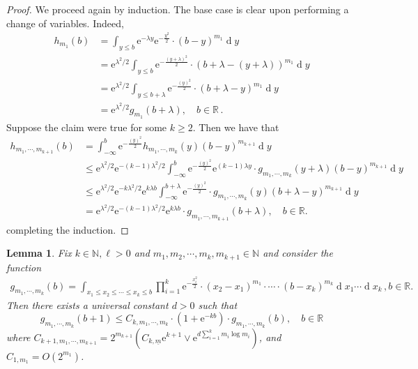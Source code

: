 \documentclass[11pt, reqno]{amsart}
\numberwithin{equation}{section}
\newcounter{dummy} \numberwithin{dummy}{section}
\newtheorem{lemma}[dummy]{Lemma}
\newcommand{\N}{\ensuremath{\mathbb{N}}}
\newcommand{\R}{\ensuremath{\mathbb{R}}}
\newcommand{\diff}{\ensuremath{\operatorname{d}\!}}
\begin{document}
\begin{proof}
    We proceed again by induction. The base case is clear upon performing a change of variables. Indeed, 
    \begin{align*}
            h_{m_1}(b) &= \displaystyle\int_{y\le b}\mathrm{e}^{-\lambda y}\mathrm{e}^{-\frac{y^2}{2}}\cdot(b-y)^{m_1}\diff y\\
            &= \mathrm{e}^{\lambda^2/2} \displaystyle\int_{y\le b}\mathrm{e}^{-\frac{(y+\lambda)^2}{2}}\cdot(b+\lambda-(y+\lambda))^{m_1}\diff y\\
            &= \mathrm{e}^{\lambda^2/2} \displaystyle\int_{y\le b+\lambda}\mathrm{e}^{-\frac{(y)^2}{2}}\cdot(b+\lambda-y)^{m_1}\diff y\\
            & = \mathrm{e}^{\lambda^2/2}g_{m_1}(b+\lambda),\quad b\in \R\,.
    \end{align*}
    Suppose the claim were true for some $k\ge 2$. Then we have that
    \begin{align*}
         h_{m_1, \cdots, m_{k+1}}(b) &= \displaystyle\int^b_{-\infty}\mathrm{e}^{-\frac{(y)^2}{2}} h_{m_1, \cdots, m_{k}}(y)(b-y)^{m_{k+1}}\diff y\\
         & \le \mathrm{e}^{\lambda^2/2}\mathrm{e}^{-(k-1)\lambda^2/2}\displaystyle\int^b_{-\infty}\mathrm{e}^{-\frac{(y)^2}{2}}  \mathrm{e}^{(k-1)\lambda y}\cdot g_{m_1, \cdots, m_k}(y+\lambda)(b-y)^{m_{k+1}}\diff y\\
         & \le  \mathrm{e}^{\lambda^2/2}\mathrm{e}^{-k\lambda^2/2}\mathrm{e}^{k\lambda b}\displaystyle\int^{b+\lambda}_{-\infty} \mathrm{e}^{-\frac{(y)^2}{2}}\cdot g_{m_1, \cdots, m_k}(y)(b+\lambda-y)^{m_{k+1}}\diff y\\
         &=  \mathrm{e}^{\lambda^2/2}\mathrm{e}^{-(k-1)\lambda^2/2}\mathrm{e}^{k\lambda b}\cdot g_{m_1, \cdots, m_{k+1}}(b+\lambda),\quad b\in \R.
    \end{align*}
    completing the induction.
\end{proof}

\begin{lemma}\label{lemma: difference bound} Fix $k\in \N, \ell> 0$ and $m_1, m_2, \cdots, m_k, m_{k+1} \in \N$ and consider the function
\begin{align*}
g_{m_1, \cdots, m_k}(b) = \displaystyle\int_{x_1\le x_2\le \cdots\le x_k\le b}\prod_{i=1}^{k}\mathrm{e}^{-\frac{x_i^2}{2}}\cdot(x_2-x_1)^{m_1}\cdot \cdots \cdot (b-x_k)^{m_k}\diff x_1\cdots \diff x_{k}\,, b\in \R.
\end{align*}
Then there exists a universal constant $d>0$ such that 
    $$
     g_{m_1, \cdots, m_k}(b+1)\le C_{k, m_1, \cdots, m_k} \cdot (1+\mathrm{e}^{-kb})\cdot g_{m_1, \cdots, m_k}(b), \quad b\in \R
    $$
    where $C_{k+1, m_1, \cdots, m_{k+1}} = 2^{m_{k+1}}(C_{k,\underline{m}}\mathrm{e}^{k+1}\lor \mathrm{e}^{d\sum_{i=1}^k m_i\log m_i})$, and $C_{1,m_1} = O(2^{m_1})$.
\end{lemma}
\end{document}
